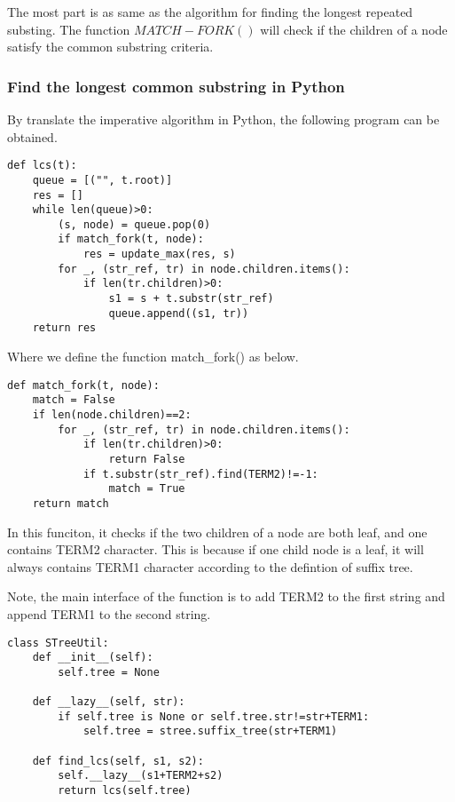 \documentclass{article}
\begin{document}
The most part is as same as the algorithm for finding the longest repeated
substing. The function $MATCH-FORK()$ will check if the children of a 
node satisfy the common substring criteria.

\subsubsection*{Find the longest common substring in Python}
By translate the imperative algorithm in Python, the following program can
be obtained.

\lstset{language=Python}
\begin{lstlisting}
def lcs(t):
    queue = [("", t.root)]
    res = []
    while len(queue)>0:
        (s, node) = queue.pop(0)
        if match_fork(t, node):
            res = update_max(res, s)
        for _, (str_ref, tr) in node.children.items():
            if len(tr.children)>0:
                s1 = s + t.substr(str_ref)
                queue.append((s1, tr))
    return res
\end{lstlisting}

Where we define the function match\_fork() as below.

\begin{lstlisting}
def match_fork(t, node):
    match = False
    if len(node.children)==2:
        for _, (str_ref, tr) in node.children.items():
            if len(tr.children)>0:
                return False
            if t.substr(str_ref).find(TERM2)!=-1:
                match = True
    return match
\end{lstlisting}
In this funciton, it checks if the two children of a node
are both leaf, and one contains TERM2 character. This is because
if one child node is a leaf, it will always contains TERM1
character according to the defintion of suffix tree.

Note, the main interface of the function is to add TERM2 to 
the first string and append TERM1 to the second string.

\begin{lstlisting}
class STreeUtil:
    def __init__(self):
        self.tree = None

    def __lazy__(self, str):
        if self.tree is None or self.tree.str!=str+TERM1:
            self.tree = stree.suffix_tree(str+TERM1)

    def find_lcs(self, s1, s2):
        self.__lazy__(s1+TERM2+s2)
        return lcs(self.tree)
\end{lstlisting}
\end{document}
